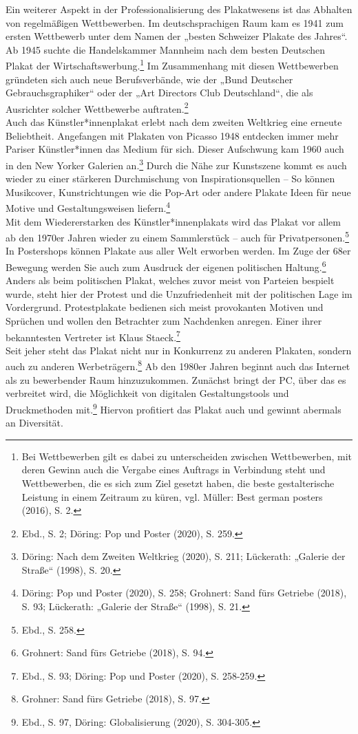 \documentclass[a4paper,12pt,ngerman]{article}
\begin{document}
Ein weiterer Aspekt in der Professionalisierung des Plakatwesens ist das Abhalten von regelmäßigen Wettbewerben. Im deutschsprachigen Raum kam es 1941 zum ersten Wettbewerb unter dem Namen der „besten Schweizer Plakate des Jahres“. Ab 1945 suchte die Handelskammer Mannheim nach dem besten Deutschen Plakat der Wirtschaftswerbung.\footnote{Bei Wettbewerben gilt es dabei zu unterscheiden zwischen Wettbewerben, mit deren Gewinn auch die Vergabe eines Auftrags in Verbindung steht und Wettbewerben, die es sich zum Ziel gesetzt haben, die beste gestalterische Leistung in einem Zeitraum zu küren, vgl. Müller: Best german posters (2016), S. 2.}  Im Zusammenhang mit diesen Wettbewerben gründeten sich auch neue Berufsverbände, wie der „Bund Deutscher Gebrauchsgraphiker“ oder der „Art Directors Club Deutschland“, die als Ausrichter solcher Wettbewerbe auftraten.\footnote{Ebd., S. 2; Döring: Pop und Poster (2020), S. 259.} \\
Auch das Künstler*innenplakat erlebt nach dem zweiten Weltkrieg eine erneute Beliebtheit. Angefangen mit Plakaten von Picasso 1948 entdecken immer mehr Pariser Künstler*innen das Medium für sich. Dieser Aufschwung kam 1960 auch in den New Yorker Galerien an.\footnote{Döring: Nach dem Zweiten Weltkrieg (2020), S. 211; Lückerath: „Galerie der Straße“ (1998), S. 20.}  Durch die Nähe zur Kunstszene kommt es auch wieder zu einer stärkeren Durchmischung von Inspirationsquellen – So können Musikcover, Kunstrichtungen wie die Pop-Art oder andere Plakate Ideen für neue Motive und Gestaltungsweisen liefern.\footnote{Döring: Pop und Poster (2020), S. 258; Grohnert: Sand fürs Getriebe (2018), S. 93; Lückerath: „Galerie der Straße“ (1998), S. 21.} \\
Mit dem Wiedererstarken des Künstler*innenplakats wird das Plakat vor allem ab den 1970er Jahren wieder zu einem Sammlerstück – auch für Privatpersonen.\footnote{Ebd., S. 258.}  In Postershops können Plakate aus aller Welt erworben werden. Im Zuge der 68er Bewegung werden Sie auch zum Ausdruck der eigenen politischen Haltung.\footnote{Grohnert: Sand fürs Getriebe (2018), S. 94.}  Anders als beim politischen Plakat, welches zuvor meist von Parteien bespielt wurde, steht hier der Protest und die Unzufriedenheit mit der politischen Lage im Vordergrund. Protestplakate bedienen sich meist provokanten Motiven und Sprüchen und wollen den Betrachter zum Nachdenken anregen. Einer ihrer bekanntesten Vertreter ist Klaus Staeck.\footnote{Ebd., S. 93; Döring: Pop und Poster (2020), S. 258-259.} \\
Seit jeher steht das Plakat nicht nur in Konkurrenz zu anderen Plakaten, sondern auch zu anderen Werbeträgern.\footnote{Grohner: Sand fürs Getriebe (2018), S. 97.}  Ab den 1980er Jahren beginnt auch das Internet als zu bewerbender Raum hinzuzukommen. Zunächst bringt der PC, über das es verbreitet wird, die Möglichkeit von digitalen Gestaltungstools und Druckmethoden mit.\footnote{Ebd., S. 97, Döring: Globalisierung (2020), S. 304-305.}  Hiervon profitiert das Plakat auch und gewinnt abermals an Diversität. \\
\end{document}
